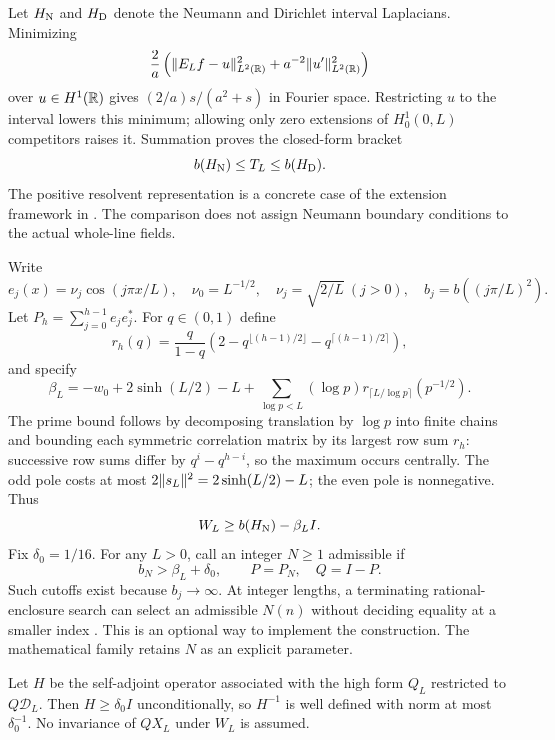 Let $H_{\rm N}$ and $H_{\rm D}$ denote the Neumann and Dirichlet interval
Laplacians. Minimizing
\[
\frac2a\left(\lVert E_Lf-u\rVert_{L^2(\mathbb R)}^2+a^{-2}\lVert u'\rVert_{L^2(\mathbb R)}^2\right)
\]
over $u\in H^1(\mathbb R)$ gives $(2/a)s/(a^2+s)$ in Fourier space.
Restricting $u$ to the interval lowers this minimum; allowing only zero
extensions of $H_0^1(0,L)$ competitors raises it. Summation proves the
closed-form bracket
\begin{equation}\label{eq:bracket}
b(H_{\rm N})\le T_L\le b(H_{\rm D}).
\end{equation}
The positive resolvent representation is a concrete case of the extension
framework in \cite{KM}. The comparison does not assign Neumann boundary
conditions to the actual whole-line fields.

Write
\[
e_j(x)=\nu_j\cos(j\pi x/L),\quad
\nu_0=L^{-1/2},\quad\nu_j=\sqrt{2/L}\ (j>0),\quad
b_j=b((j\pi/L)^2).
\]
Let $P_h=\sum_{j=0}^{h-1}e_je_j^*$. For $q\in(0,1)$ define
\[
r_h(q)=\frac{q}{1-q}
\left(2-q^{\lfloor(h-1)/2\rfloor}-q^{\lceil(h-1)/2\rceil}\right),
\]
and specify
\begin{equation}\label{eq:beta}
\beta_L=-w_0+2\sinh(L/2)-L+
\sum_{\log p<L}(\log p)r_{\lceil L/\log p\rceil}(p^{-1/2}).
\end{equation}
The prime bound follows by decomposing translation by $\log p$ into finite
chains and bounding each symmetric correlation matrix by its largest row
sum $r_h$: successive row sums differ by $q^i-q^{h-i}$, so the
maximum occurs centrally. The odd pole costs at most $2\lVert s_L\rVert^2=2\sinh(L/2)-L$;
the even pole is nonnegative. Thus
\begin{equation}\label{eq:lower}
W_L\ge b(H_{\rm N})-\beta_LI.
\end{equation}
Fix $\delta_0=1/16$. For any $L>0$, call an integer $N\ge1$ admissible if
\begin{equation}\label{eq:N}
b_N>\beta_L+\delta_0,\qquad P=P_N,\quad Q=I-P.
\end{equation}
Such cutoffs exist because $b_j\to\infty$. At integer lengths, a terminating
rational-enclosure search can select an admissible $N(n)$ without deciding
equality at a smaller index \cite[Section 4]{Companion}. This is an optional
way to implement the construction. The mathematical family retains $N$
as an explicit parameter.

Let $H$ be the self-adjoint operator associated with the high form
$Q_L$ restricted to $Q\mathcal D_L$. Then $H\ge\delta_0I$ unconditionally,
so $H^{-1}$ is well defined with norm at most $\delta_0^{-1}$.
No invariance of $QX_L$ under $W_L$ is assumed.

